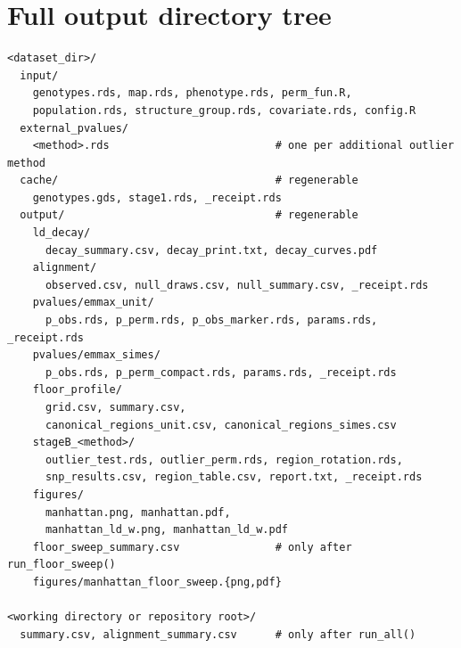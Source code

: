\documentclass[11pt]{article}
\begin{document}
\appendix
\section{Full output directory tree}
\label{sec:appendix-tree}

\begin{Verbatim}[samepage=true]
<dataset_dir>/
  input/
    genotypes.rds, map.rds, phenotype.rds, perm_fun.R,
    population.rds, structure_group.rds, covariate.rds, config.R
  external_pvalues/
    <method>.rds                          # one per additional outlier method
  cache/                                  # regenerable
    genotypes.gds, stage1.rds, _receipt.rds
  output/                                 # regenerable
    ld_decay/
      decay_summary.csv, decay_print.txt, decay_curves.pdf
    alignment/
      observed.csv, null_draws.csv, null_summary.csv, _receipt.rds
    pvalues/emmax_unit/
      p_obs.rds, p_perm.rds, p_obs_marker.rds, params.rds, _receipt.rds
    pvalues/emmax_simes/
      p_obs.rds, p_perm_compact.rds, params.rds, _receipt.rds
    floor_profile/
      grid.csv, summary.csv,
      canonical_regions_unit.csv, canonical_regions_simes.csv
    stageB_<method>/
      outlier_test.rds, outlier_perm.rds, region_rotation.rds,
      snp_results.csv, region_table.csv, report.txt, _receipt.rds
    figures/
      manhattan.png, manhattan.pdf,
      manhattan_ld_w.png, manhattan_ld_w.pdf
    floor_sweep_summary.csv               # only after run_floor_sweep()
    figures/manhattan_floor_sweep.{png,pdf}

<working directory or repository root>/
  summary.csv, alignment_summary.csv      # only after run_all()
\end{Verbatim}
\end{document}
